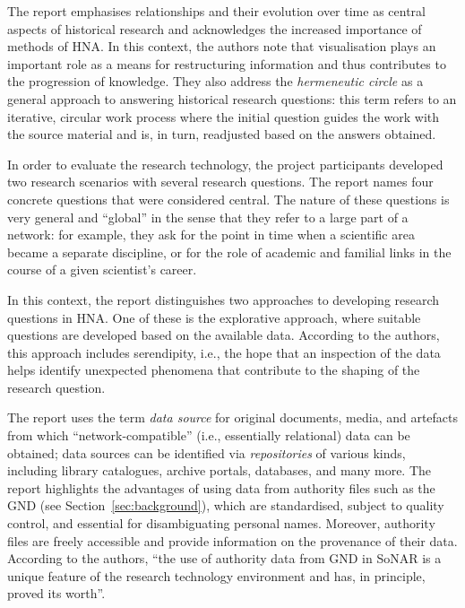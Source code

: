The report emphasises relationships and their evolution over time
as central aspects of historical research and acknowledges the increased 
importance of methods of HNA. In this context, the authors note that visualisation plays an important role
as a means for restructuring information and thus contributes to the progression of knowledge.
They also address the \emph{hermeneutic circle} \autocite{Malpas2015}
as a general approach to answering historical research questions:
this term refers to an iterative, circular work process
where the initial question guides the work with the source material
and is, in turn, readjusted based on the answers obtained.

In order to evaluate the research technology,
the project participants developed two research scenarios
with several research questions.
The report names four concrete questions that were considered central.
The nature of these questions is very general and \enquote{global}
in the sense that they refer to a large part of a network:
for example, they ask for the point in time when a scientific area became a separate discipline,
or for the role of academic and familial links in the course of a given scientist's career.

In this context, the report distinguishes two approaches to developing research questions
in HNA. One of these is the explorative approach,
where suitable questions are developed based on the available data.
According to the authors, this approach includes serendipity,
i.e., the hope that an inspection of the data helps identify unexpected
phenomena that contribute to the shaping of the research question.

The report uses the term \emph{data source} for original documents, media, and artefacts
from which \enquote{network-compatible} (i.e., essentially relational) data can be obtained;
data sources can be identified via \emph{repositories} of various kinds,
including library catalogues, archive portals, databases, and many more.
The report highlights the advantages of using data from authority files
such as the GND (see Section~\ref{sec:background}), which are standardised,
subject to quality control, and essential for disambiguating personal names.
Moreover, authority files are freely accessible and provide information
on the provenance of their data. According to the authors,
\enquote{the use of authority data from GND in SoNAR is a unique feature
of the research technology environment and has, in principle, proved its worth}.

